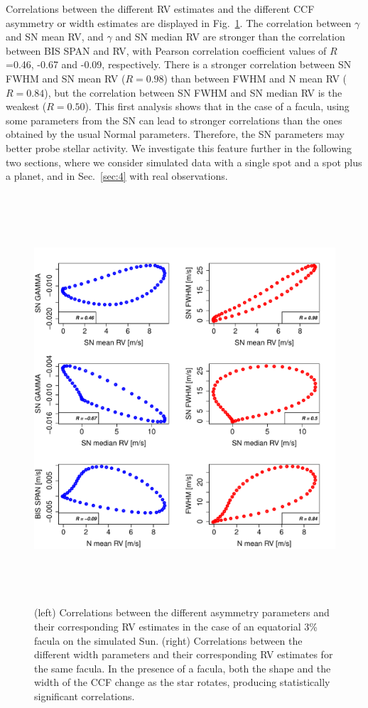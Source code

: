 \documentclass{aa}
\begin{document}
Correlations between the different RV estimates and the different CCF asymmetry or width estimates are displayed in Fig.~\ref{fig:faculae.corr}. 
The correlation between $\gamma$ and SN mean RV, and $\gamma$ and SN median RV are stronger than the correlation between BIS SPAN and RV, with Pearson correlation coefficient values of $R$=0.46, -0.67 and -0.09, respectively. 
%
There is a stronger correlation between SN FWHM and SN mean RV ($R=0.98$) than between FWHM and N mean RV ($R=0.84$), but the correlation between SN FWHM and SN median RV is the weakest ($R=0.50$). 
This first analysis shows that in the case of a facula, using some parameters from the SN can lead to stronger correlations than the ones obtained by the usual Normal parameters. Therefore, the SN parameters may better probe stellar activity. 
We investigate this feature further in the following two sections, where we consider simulated data with a single spot and a spot plus a planet, and in Sec.~\ref{sec:4} with real observations.

\begin{figure}[htbp]
\begin{center}
\includegraphics[height = 6in]{SOAP_FACULAE_Comparison_para_SN.pdf} 
   \caption{(left) Correlations between the different asymmetry parameters and their corresponding RV estimates in the case of an equatorial 3\% facula on the simulated Sun. (right) Correlations between the different width parameters and their corresponding RV estimates for the same facula.
   In the presence of a facula, both the shape and the width of the CCF change as the star rotates, producing statistically significant correlations.}
    \label{fig:faculae.corr}
\end{center}
\end{figure}
\end{document}

